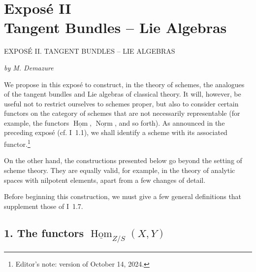 
\setcounter{footnote}{-1}
\chapter*{Expos\'e II\\Tangent Bundles -- Lie Algebras}
%
  {EXPOS\'E II. TANGENT BUNDLES -- LIE ALGEBRAS}

\begin{center}
  \textit{by M. Demazure}
\end{center}

We propose in this expos\'e to construct, in the theory of schemes, the
analogues of the tangent bundles and Lie algebras of classical theory. It
will, however, be useful not to restrict ourselves to schemes proper, but
also to consider certain functors on the category of schemes that are not
necessarily representable (for example, the functors
\(\underline{\operatorname{Hom}}\), \(\underline{\operatorname{Norm}}\),
and so forth). As announced in the preceding expos\'e (cf. I~1.1), we shall
identify a scheme with its associated functor.\footnote{Editor's note:
version of October 14, 2024.}

On the other hand, the constructions presented below go beyond the setting
of scheme theory. They are equally valid, for example, in the theory of
analytic spaces with nilpotent elements, apart from a few changes of detail.

Before beginning this construction, we must give a few general definitions
that supplement those of I~1.7.

\section*{1. The functors
  \(\underline{\operatorname{Hom}}_{Z/S}(X,Y)\)}

